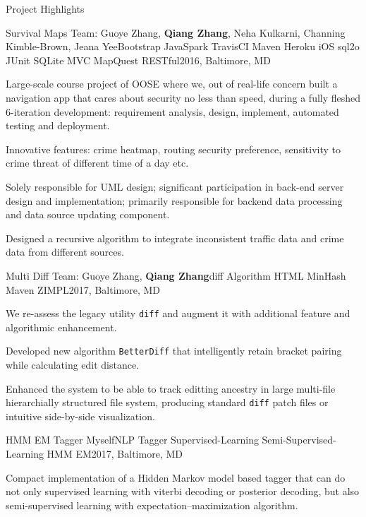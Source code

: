 \documentclass{resume} %
\begin{document}
\begin{rSection}{Project Highlights}

\begin{rSubsection}{Survival Maps \href{https://github.com/cc941201/SurvivalMaps}{\textcolor{blue}{\faGithub}}}{Team: Guoye Zhang, {\bf Qiang Zhang}, Neha Kulkarni, Channing Kimble-Brown, Jeana Yee}{Bootstrap JavaSpark TravisCI Maven Heroku iOS sql2o JUnit SQLite MVC MapQuest RESTful}{2016, Baltimore, MD}
\item Large-scale course project of OOSE where we, out of real-life concern built a navigation app that cares about security no less than speed, during a fully fleshed 6-iteration development: requirement analysis, design, implement, automated testing and deployment.
\item Innovative features: crime heatmap, routing security preference, sensitivity to crime threat of different time of a day etc.
\item Solely responsible for UML design; significant participation in back-end server design and implementation; primarily responsible for backend data processing and data source updating component.
\item Designed a recursive algorithm to integrate inconsistent traffic data and crime data from different sources.
\end{rSubsection}
\begin{rSubsection}{Multi Diff \href{https://github.com/vegito2002/multi-diff}{\textcolor{blue}{\faGithub}}}{Team: Guoye Zhang, {\bf Qiang Zhang}}{diff Algorithm HTML MinHash Maven ZIMPL}{2017, Baltimore, MD}
\item We re-assess the legacy utility \texttt{diff} and augment it with additional feature and algorithmic enhancement.
\item Developed new algorithm \texttt{BetterDiff} that intelligently retain bracket pairing while calculating edit distance.
\item Enhanced the system to be able to track editting ancestry in large multi-file hierarchially structured file system, producing standard \texttt{diff} patch files or intuitive side-by-side visualization.
\end{rSubsection}
\begin{rSubsection}{HMM EM Tagger \href{https://github.com/vegito2002/hmm-em-tagger}{\textcolor{blue}{\faGithub}}}{Myself}{NLP Tagger Supervised-Learning Semi-Supervised-Learning HMM EM}{2017, Baltimore, MD}
\item Compact implementation of a Hidden Markov model based tagger that can do not only supervised learning with viterbi decoding or posterior decoding, but also semi-supervised learning with expectation–maximization algorithm.

\end{rSubsection}
\end{rSection}
\end{document}
